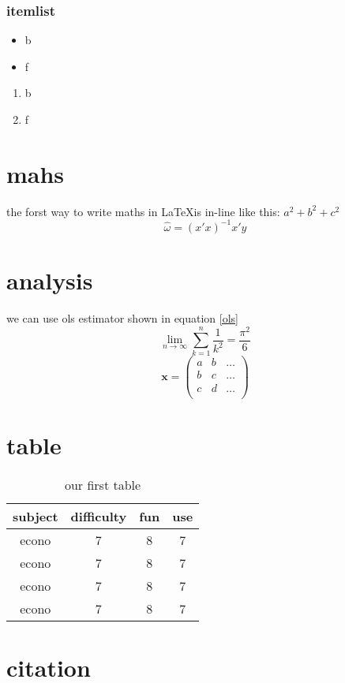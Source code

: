 \documentclass[a4paper, 12pt, oneside] {article}
\begin{document}
\subsubsection{itemlist}
\begin{itemize}

\item{b}
{\setlength\itemindent{25pt}}
\item{f}

\end{itemize}
\begin{enumerate}
\item{b}
\item{f}
\end{enumerate}

\section{mahs}
the forst way to write maths in \LaTeX is in-line like this:
$a^2+b^2+c^2$
\begin{equation}\label{ols}
\hat{\omega}=(x'x)^{-1}x'y
\end{equation}
\section{analysis}
we can use ols estimator shown in equation 
\ref{ols}
\begin{equation}
\lim_{n \to \infty}
\sum_{k=1}^n \frac{1}{k^2}
=\frac{\pi^2}{6}
\end{equation}
\begin{equation*}
\mathbf{x} = \left(
\begin{array}{ccc}
a & b & \ldots \\
b & c & \ldots \\
c & d & \ldots \\
\end{array}\right)
\end{equation*}



\section{table}
\begin{center}
\begin{table}[!h]
\caption{our first table}
\vspace{0.15in}
\begin{tabular}{c | c | c | c}
subject & difficulty & fun & use\\ \hline
econo & 7 & 8 & 7\\
econo & 7 & 8 & 7\\
econo & 7 & 8 & 7\\
econo & 7 & 8 & 7\\
\end{tabular}
\end{table}
\end{center}

\section{citation}
\cite{william}


\end{document}
